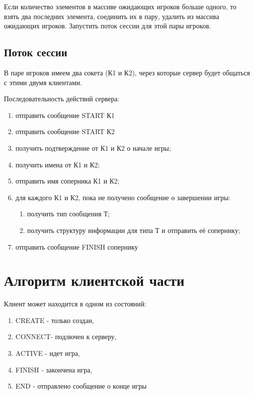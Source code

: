 Если количество элементов в массиве ожидающих игроков больше одного, то взять два последних элемента, соединить их в пару, удалить из массива ожидающих игроков. Запустить поток сессии для этой пары игроков.  

\subsection{Поток сессии}

В паре игроков имеем два сокета (К1 и К2), через которые сервер будет общаться с этими двумя клиентами.

Последовательность действий сервера:
\begin{enumerate}
\item отправить сообщение START К1
\item отправить сообщение START К2
\item получить подтверждение от К1 и К2 о начале игры;
\item получить имена от К1 и К2;
\item отправить имя соперника К1 и К2;
\item для каждого К1 и К2, пока не получено сообщение о завершении игры:
	\begin{enumerate}
	\item получить тип сообщения Т;
	\item получить структуру информации для типа Т и отправить её сопернику;
	\end{enumerate}
\item отправить сообщение FINISH сопернику
\end{enumerate} 

\section{Алгоритм клиентской части}

Клиент может находится в одном из состояний:
\begin{enumerate}
\item CREATE - только создан,
\item CONNECT- подлючен к серверу,
\item ACTIVE - идет игра,
\item FINISH - закончена игра,
\item END - отправлено сообщение о конце игры
\end{enumerate}


